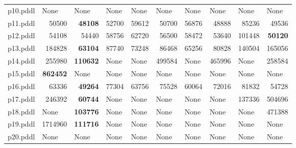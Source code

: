 \documentclass{article}
\begin{document}
\begin{tabular}{@{}lrrrrrrrrr@{}}
p10.pddl & \multicolumn{1}{|l|}{None} & \multicolumn{1}{|l|}{None} & \multicolumn{1}{|l|}{None} & \multicolumn{1}{|l|}{None} & \multicolumn{1}{|l|}{None} & \multicolumn{1}{|l|}{None} & \multicolumn{1}{|l|}{None} & \multicolumn{1}{|l|}{None} & \multicolumn{1}{|l|}{None} \\
p11.pddl & 50500 & \textbf{48108} & 52700 & 59612 & 50700 & 56876 & 48888 & 85236 & 49536 \\
p12.pddl & 54108 & 54440 & 58756 & 62720 & 56500 & 58472 & 53640 & 101448 & \textbf{50120} \\
p13.pddl & 184828 & \textbf{63104} & 87740 & 73248 & 86468 & 65256 & 80828 & 140504 & 165056 \\
p14.pddl & 255980 & \textbf{110632} & \multicolumn{1}{|l|}{None} & \multicolumn{1}{|l|}{None} & 499584 & \multicolumn{1}{|l|}{None} & 465996 & \multicolumn{1}{|l|}{None} & 258584 \\
p15.pddl & \textbf{862452} & \multicolumn{1}{|l|}{None} & \multicolumn{1}{|l|}{None} & \multicolumn{1}{|l|}{None} & \multicolumn{1}{|l|}{None} & \multicolumn{1}{|l|}{None} & \multicolumn{1}{|l|}{None} & \multicolumn{1}{|l|}{None} & \multicolumn{1}{|l|}{None} \\
p16.pddl & 63336 & \textbf{49264} & 77304 & 63756 & 75528 & 60064 & 72016 & 81832 & 54728 \\
p17.pddl & 246392 & \textbf{60744} & \multicolumn{1}{|l|}{None} & \multicolumn{1}{|l|}{None} & \multicolumn{1}{|l|}{None} & \multicolumn{1}{|l|}{None} & \multicolumn{1}{|l|}{None} & 137336 & 504696 \\
p18.pddl & \multicolumn{1}{|l|}{None} & \textbf{103776} & \multicolumn{1}{|l|}{None} & \multicolumn{1}{|l|}{None} & \multicolumn{1}{|l|}{None} & \multicolumn{1}{|l|}{None} & \multicolumn{1}{|l|}{None} & \multicolumn{1}{|l|}{None} & 471388 \\
p19.pddl & 1714960 & \textbf{111716} & \multicolumn{1}{|l|}{None} & \multicolumn{1}{|l|}{None} & \multicolumn{1}{|l|}{None} & \multicolumn{1}{|l|}{None} & \multicolumn{1}{|l|}{None} & \multicolumn{1}{|l|}{None} & \multicolumn{1}{|l|}{None} \\
p20.pddl & \multicolumn{1}{|l|}{None} & \multicolumn{1}{|l|}{None} & \multicolumn{1}{|l|}{None} & \multicolumn{1}{|l|}{None} & \multicolumn{1}{|l|}{None} & \multicolumn{1}{|l|}{None} & \multicolumn{1}{|l|}{None} & \multicolumn{1}{|l|}{None} & \multicolumn{1}{|l|}{None} \\
\end{tabular}

\hypertarget{operators}{}
\end{document}
